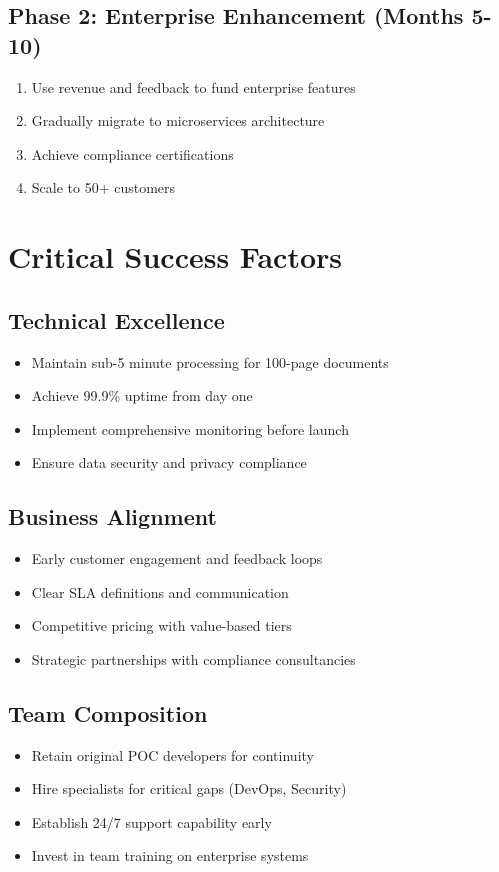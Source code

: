 \documentclass[12pt,a4paper]{report}
\begin{document}
\subsection{Phase 2: Enterprise Enhancement (Months 5-10)}
\begin{enumerate}
    \item Use revenue and feedback to fund enterprise features
    \item Gradually migrate to microservices architecture
    \item Achieve compliance certifications
    \item Scale to 50+ customers
\end{enumerate}

\section{Critical Success Factors}

\subsection{Technical Excellence}
\begin{itemize}
    \item Maintain sub-5 minute processing for 100-page documents
    \item Achieve 99.9\% uptime from day one
    \item Implement comprehensive monitoring before launch
    \item Ensure data security and privacy compliance
\end{itemize}

\subsection{Business Alignment}
\begin{itemize}
    \item Early customer engagement and feedback loops
    \item Clear SLA definitions and communication
    \item Competitive pricing with value-based tiers
    \item Strategic partnerships with compliance consultancies
\end{itemize}

\subsection{Team Composition}
\begin{itemize}
    \item Retain original POC developers for continuity
    \item Hire specialists for critical gaps (DevOps, Security)
    \item Establish 24/7 support capability early
    \item Invest in team training on enterprise systems
\end{itemize}
\end{document}
